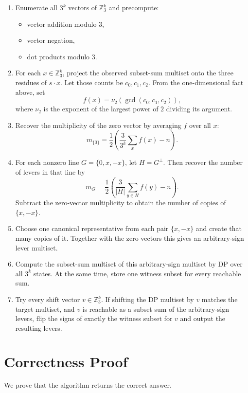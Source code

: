 \documentclass[11pt]{article}
\begin{document}
\begin{enumerate}[leftmargin=*]
    \item Enumerate all $3^k$ vectors of $\mathbb{Z}_3^k$ and precompute:
    \begin{itemize}[leftmargin=*]
        \item vector addition modulo $3$,
        \item vector negation,
        \item dot products modulo $3$.
    \end{itemize}
    \item For each $x \in \mathbb{Z}_3^k$, project the observed subset-sum multiset onto the three
    residues of $s \cdot x$. Let those counts be $c_0,c_1,c_2$. From the one-dimensional fact above,
    set
    \[
    f(x) = \nu_2(\gcd(c_0,c_1,c_2)),
    \]
    where $\nu_2$ is the exponent of the largest power of $2$ dividing its argument.
    \item Recover the multiplicity of the zero vector by averaging $f$ over all $x$:
    \[
    m_{\{0\}} =
    \frac{1}{2}\left(\frac{3}{3^k}\sum_x f(x) - n\right).
    \]
    \item For each nonzero line $G = \{0,x,-x\}$, let $H = G^\perp$. Then recover the number of
    levers in that line by
    \[
    m_G =
    \frac{1}{2}\left(\frac{3}{|H|}\sum_{y \in H} f(y) - n\right).
    \]
    Subtract the zero-vector multiplicity to obtain the number of copies of $\{x,-x\}$.
    \item Choose one canonical representative from each pair $\{x,-x\}$ and create that many copies
    of it. Together with the zero vectors this gives an arbitrary-sign lever multiset.
    \item Compute the subset-sum multiset of this arbitrary-sign multiset by DP over all $3^k$ states.
    At the same time, store one witness subset for every reachable sum.
    \item Try every shift vector $v \in \mathbb{Z}_3^k$. If shifting the DP multiset by $v$ matches the
    target multiset, and $v$ is reachable as a subset sum of the arbitrary-sign levers, flip the signs of
    exactly the witness subset for $v$ and output the resulting levers.
\end{enumerate}

\section*{Correctness Proof}

We prove that the algorithm returns the correct answer.
\end{document}
